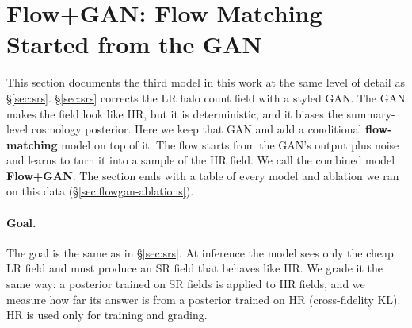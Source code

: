 
\newcommand{\abgood}[1]{\textcolor{ablgood}{\textbf{#1}}}

\section{Flow+GAN: Flow Matching Started from the GAN}
\label{sec:flowgan}

This section documents the third model in this work at the same level of detail
as \S\ref{sec:srs}. \S\ref{sec:srs} corrects the LR halo count field with a
styled GAN. The GAN makes the field look like HR, but it is deterministic, and
it biases the summary-level cosmology posterior. Here we keep that GAN and add a
conditional \textbf{flow-matching} model on top of it. The flow starts from the
GAN's output plus noise and learns to turn it into a sample of the HR field. We
call the combined model \textbf{Flow+GAN}. The section ends with a table of
every model and ablation we ran on this data (\S\ref{sec:flowgan-ablations}).

\paragraph{Goal.} The goal is the same as in \S\ref{sec:srs}. At inference the
model sees only the cheap LR field and must produce an SR field that behaves like
HR. We grade it the same way: a posterior trained on SR fields is applied to HR
fields, and we measure how far its answer is from a posterior trained on HR
(cross-fidelity KL). HR is used only for training and grading.

